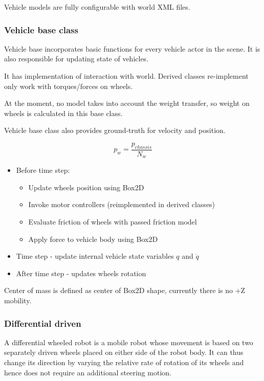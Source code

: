 \documentclass[a4paper,11pt]{article}
\begin{document}
Vehicle models are fully configurable with world XML files.

\subsubsection{Vehicle base class}

Vehicle base incorporates basic functions for every vehicle actor in the scene. It is also responsible for updating state of vehicles.

It has implementation of interaction with world. Derived classes re-implement only work with torques/forces on wheels.

At the moment, no model takes into account the weight transfer, so weight on wheels is calculated in this base class.

Vehicle base class also provides ground-truth for velocity and position.
\begin{center}
\[
p_w = \frac{p_{chassis}}{N_w}
\]
\end{center}

\begin{itemize}
	\item Before time step:
	\begin{itemize}
		\item Update wheels position using Box2D
		\item Invoke motor controllers (reimplemented in derived classes)
		\item Evaluate friction of wheels with passed friction model
		\item Apply force to vehicle body using Box2D
	\end{itemize}
	\item Time step - update internal vehicle state variables $q$ and $\dot{q}$
	\item After time step - updates wheels rotation
\end{itemize}

Center of mass is defined as center of Box2D shape, currently there is no +Z mobility.

\subsubsection{Differential driven}

A differential wheeled robot is a mobile robot whose movement is based on two separately driven wheels placed on either side of the robot body. It can thus change its direction by varying the relative rate of rotation of its wheels and hence does not require an additional steering motion.
\end{document}
